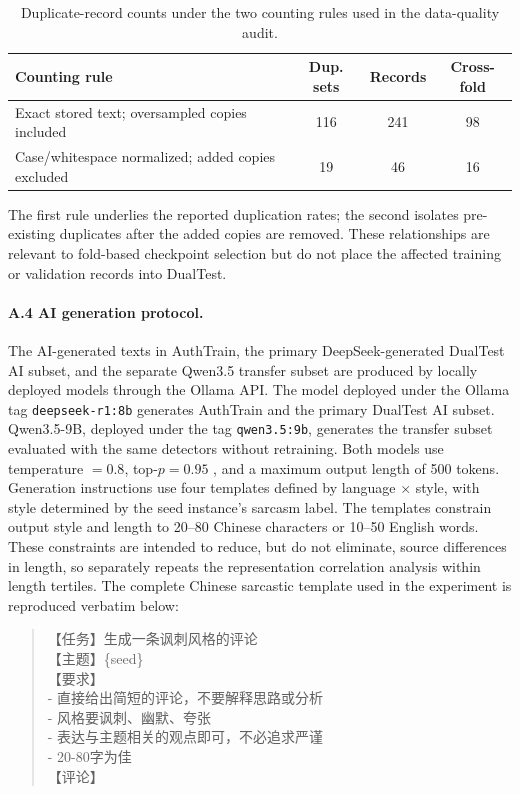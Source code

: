 \begin{table}[H]
  \centering
  \footnotesize
  \setlength{\tabcolsep}{3pt}
  \begin{tabular}{@{}p{3.25cm}ccc@{}}
    \toprule
    \textbf{Counting rule} & \textbf{Dup. sets} & \textbf{Records} & \textbf{Cross-fold} \\
    \midrule
    Exact stored text; oversampled copies included & 116 & 241 & 98 \\
    Case/whitespace normalized; added copies excluded & 19 & 46 & 16 \\
    \bottomrule
  \end{tabular}
  \caption{Duplicate-record counts under the two counting rules used in the data-quality audit.}
  \label{tab:dup-rules}
\end{table}

The first rule underlies the reported duplication rates; the second isolates pre-existing duplicates after the added copies are removed. These relationships are relevant to fold-based checkpoint selection but do not place the affected training or validation records into DualTest.

\label{app:a4}\paragraph{A.4 AI generation protocol.} The AI-generated texts in AuthTrain, the primary DeepSeek-generated DualTest AI subset, and the separate Qwen3.5 transfer subset are produced by locally deployed models through the Ollama API. The model deployed under the Ollama tag \texttt{deepseek-r1:8b} generates AuthTrain and the primary DualTest AI subset. Qwen3.5-9B, deployed under the tag \texttt{qwen3.5:9b}, generates the transfer subset evaluated with the same detectors without retraining. Both models use temperature $= 0.8$, top-$p = 0.95$ \citep{holtzman2020nucleus}, and a maximum output length of 500 tokens. Generation instructions use four templates defined by language $\times$ style, with style determined by the seed instance's sarcasm label. The templates constrain output style and length to 20--80 Chinese characters or 10--50 English words. These constraints are intended to reduce, but do not eliminate, source differences in length, so  separately repeats the representation correlation analysis within length tertiles. The complete Chinese sarcastic template used in the experiment is reproduced verbatim below:

\begin{quote}\small\ttfamily
【任务】生成一条讽刺风格的评论\\
【主题】\{seed\}\\
【要求】\\
- 直接给出简短的评论，不要解释思路或分析\\
- 风格要讽刺、幽默、夸张\\
- 表达与主题相关的观点即可，不必追求严谨\\
- 20-80字为佳\\
【评论】
\end{quote}

